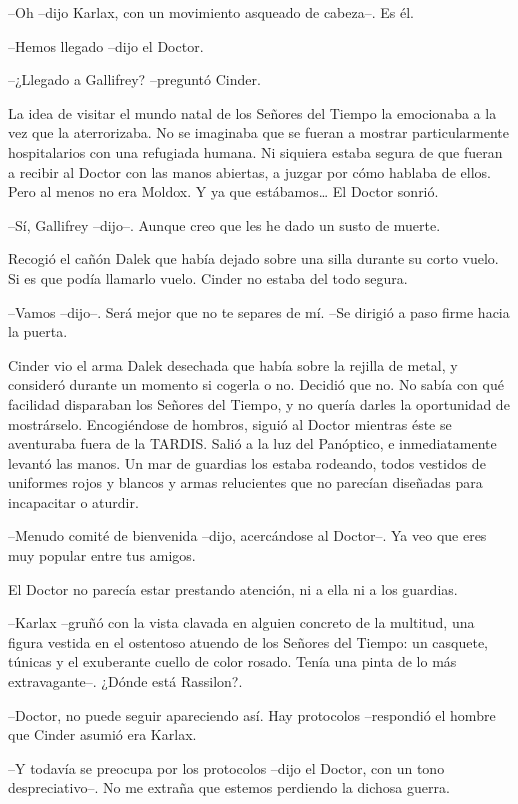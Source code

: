 --Oh --dijo Karlax, con un movimiento asqueado de cabeza--. Es él. 

\mbox{}

--Hemos llegado --dijo el Doctor.

--¿Llegado a Gallifrey? --preguntó Cinder.

La idea de visitar el mundo natal de los Señores del Tiempo la emocionaba a la vez que la aterrorizaba. No se imaginaba que se fueran a mostrar particularmente hospitalarios con una refugiada humana. Ni siquiera estaba segura de que fueran a recibir al Doctor con las manos abiertas, a juzgar por cómo hablaba de ellos. Pero al menos no era Moldox. Y ya que estábamos… El Doctor sonrió.

--Sí, Gallifrey --dijo--. Aunque creo que les he dado un susto de muerte. 

Recogió el cañón Dalek que había dejado sobre una silla durante su corto vuelo. Si es que podía llamarlo vuelo. Cinder no estaba del todo segura.

--Vamos --dijo--. Será mejor que no te separes de mí. --Se dirigió a paso firme hacia la puerta.

Cinder vio el arma Dalek desechada que había sobre la rejilla de metal, y consideró durante un momento si cogerla o no. Decidió que no. No sabía con qué facilidad disparaban los Señores del Tiempo, y no quería darles la oportunidad de mostrárselo.
Encogiéndose de hombros, siguió al Doctor mientras éste se aventuraba fuera de la TARDIS.
Salió a la luz del Panóptico, e inmediatamente levantó las manos. Un mar de guardias los estaba rodeando, todos vestidos de uniformes rojos y blancos y armas relucientes que no parecían diseñadas para incapacitar o aturdir.

--Menudo comité de bienvenida --dijo, acercándose al Doctor--. Ya veo que eres muy popular entre tus amigos.

El Doctor no parecía estar prestando atención, ni a ella ni a los guardias.

--Karlax --gruñó con la vista clavada en alguien concreto de la multitud, una figura vestida en el ostentoso atuendo de los Señores del Tiempo: un casquete, túnicas y el exuberante cuello de color rosado. Tenía una pinta de lo más extravagante--. ¿Dónde está Rassilon?.

--Doctor, no puede seguir apareciendo así. Hay protocolos --respondió el hombre que Cinder asumió era Karlax.

--Y todavía se preocupa por los protocolos --dijo el Doctor, con un tono despreciativo--. No me extraña que estemos perdiendo la dichosa guerra.

